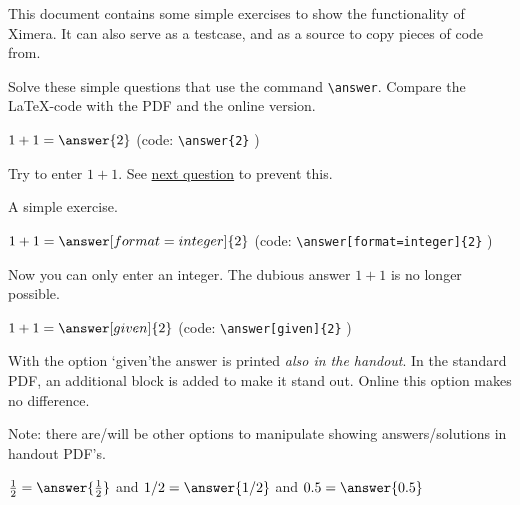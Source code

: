 \documentclass{ximera}
\begin{document}
    \author{Wim Obbels}
    \label{xim:simple_exercies}

This document contains some simple exercises to show the functionality of Ximera. 
It can also serve as a testcase, and as a source to copy pieces of code from.

\begin{exercise}    
    Solve these simple questions that use the command \verb|\answer|. 
    Compare the \LaTeX-code with the PDF and the online version.
	\begin{question} $1+1 = \answer{2}$                 \hspace{2cm} (code:  \verb|\answer{2}| )
        \begin{hint} 
            Try to enter $1+1$. See \hyperref[exc:answer_integer]{next question} to prevent this.
        \end{hint} 
        \begin{oplossing}
            A simple exercise. %
        \end{oplossing}
    \end{question}

    \begin{question} $1+1 = \answer[format=integer]{2}$ \hspace{2cm} (code:  \verb|\answer[format=integer]{2}| )
        \begin{oplossing}
            Now you can only enter an integer. The dubious answer $1+1$ is no longer possible.
        \end{oplossing}
    \end{question}

    \begin{question} $1+1 = \answer[given]{2}$          \hspace{2cm} (code:  \verb|\answer[given]{2}| )
        \begin{oplossing}
           With the option \lq given\rq the answer is printed  \textit{also in the handout}. 
            In the standard PDF, an additional block is added to make it stand out.
            Online this option makes no difference.

            Note: there are/will be other options to manipulate showing answers/solutions in handout PDF's.
        \end{oplossing}
    \end{question}

    \begin{question}
         $\frac{1}{2} =  \answer{\frac{1}{2}}$  and $1/2=\answer{1/2}$ and $0.5 =\answer{0.5}$


\end{question}
\end{exercise}
\end{document}
